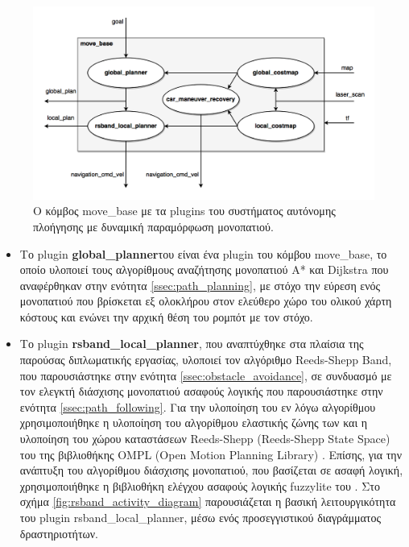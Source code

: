 \begin{figure}[!ht]
	\centering
	\includegraphics[width=\linewidth]{Chapters/Chapter4/Figures/navigation_1_plugins.png}
	\caption{Ο κόμβος move{\_}base με τα plugins του συστήματος αυτόνομης πλοήγησης με δυναμική παραμόρφωση μονοπατιού.}
	\label{fig:navigation_1_plugins}
\end{figure}

\begin{itemize}
	\item Το plugin \textbf{global{\_}planner}του \citeauthor{global_planner} \cite{global_planner} είναι ένα plugin του κόμβου move{\_}base, το οποίο υλοποιεί τους αλγορίθμους αναζήτησης μονοπατιού A* και Dijkstra που αναφέρθηκαν στην ενότητα \ref{ssec:path_planning}, με στόχο την εύρεση ενός μονοπατιού που βρίσκεται εξ ολοκλήρου στον ελεύθερο χώρο του ολικού χάρτη κόστους και ενώνει την αρχική θέση του ρομπότ με τον στόχο.
	\item Το plugin \textbf{rsband{\_}local{\_}planner}, που αναπτύχθηκε στα πλαίσια της παρούσας διπλωματικής εργασίας, υλοποιεί τον αλγόριθμο Reeds-Shepp Band, που παρουσιάστηκε στην ενότητα \ref{ssec:obstacle_avoidance}, σε συνδυασμό με τον ελεγκτή διάσχισης μονοπατιού ασαφούς λογικής που παρουσιάστηκε στην ενότητα \ref{ssec:path_following}. Για την υλοποίηση του εν λόγω αλγορίθμου χρησιμοποιήθηκε η υλοποίηση του αλγορίθμου ελαστικής ζώνης των \citeauthor{eband_local_planner} \cite{eband_local_planner} και η υλοποίηση του χώρου καταστάσεων Reeds-Shepp (Reeds-Shepp State Space) του \citeauthor{reeds_shepp_ompl} \cite{reeds_shepp_ompl} της βιβλιοθήκης OMPL (Open Motion Planning Library) \cite{ompl}. Επίσης, για την ανάπτυξη του αλγορίθμου διάσχισης μονοπατιού, που βασίζεται σε ασαφή λογική, χρησιμοποιήθηκε η βιβλιοθήκη ελέγχου ασαφούς λογικής fuzzylite \cite{fuzzylite} του \citeauthor{fuzzylite}. Στο σχήμα \ref{fig:rsband_activity_diagram} παρουσιάζεται η βασική λειτουργικότητα του plugin rsband{\_}local{\_}planner, μέσω ενός προσεγγιστικού διαγράμματος δραστηριοτήτων.
\end{itemize}

